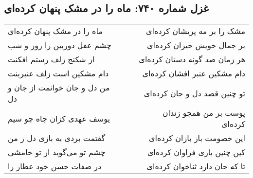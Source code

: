 \begin{center}
\section*{غزل شماره ۷۴۰: ماه را در مشک پنهان کرده‌ای}
\label{sec:740}
\begin{longtable}{l p{0.5cm} r}
ماه را در مشک پنهان کرده‌ای
&&
مشک را بر مه پریشان کرده‌ای
\\
چشم عقل دوربین را روز و شب
&&
بر جمال خویش حیران کرده‌ای
\\
از شکنج زلف رستم افکنت
&&
هر زمان صد گونه دستان کرده‌ای
\\
دام مشکین است زلف عنبرینت
&&
دام مشکین عنبر افشان کرده‌ای
\\
من دل و جان خوانمت از جان و دل
&&
تو چنین قصد دل و جان کرده‌ای
\\
یوسف عهدی کزان چاه چو سیم
&&
پوست بر من همچو زندان کرده‌ای
\\
گفتمت بردی به بازی دل ز من
&&
این خصومت باز بازان کرده‌ای
\\
چشم تو می‌گوید از تو خامشی
&&
کین چنین بازی فراوان کرده‌ای
\\
در صفات حسن خود عطار را
&&
تا که جان دارد ثناخوان کرده‌ای
\\
\end{longtable}
\end{center}
